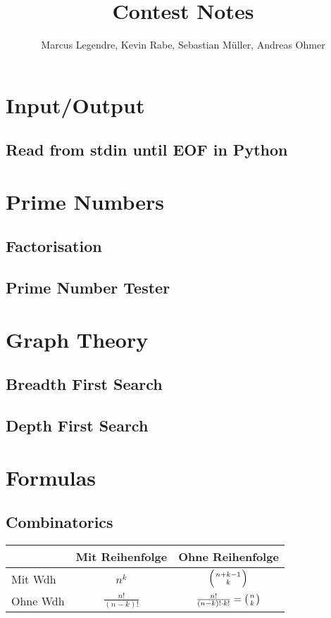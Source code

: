 \documentclass[11pt,twocolumn]{article}
\title{Contest Notes}
\author{Marcus Legendre, Kevin Rabe, Sebastian Müller, Andreas Ohmer}
\date{}
\begin{document}
\maketitle

\tableofcontents


\section{Input/Output}

\subsection{Read from stdin until EOF in Python}



\section{Prime Numbers}

\subsection{Factorisation}


\subsection{Prime Number Tester}



\section{Graph Theory}

\subsection{Breadth First Search}


\subsection{Depth First Search}



\section{Formulas}

\subsection{Combinatorics}
\begin{tabular}{ | l | c | c |}
  \hline
   & Mit Reihenfolge & Ohne Reihenfolge \\ \hline
   Mit Wdh & $n^k$ & $\left( {n+k-1} \atop k \right)$  \\ \hline
   Ohne Wdh & $\frac{n!}{\left( n-k \right) !}$ & $\frac{n!}{\left( n-k \right) !\cdot k!} = \left( n \atop k \right)$  \\ \hline
\end{tabular}
\end{document}
